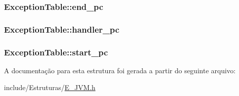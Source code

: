 \subsubsection[{end\+\_\+pc}]{ Exception\+Table\+::end\+\_\+pc}\label{struct_exception_table_ac2df73606ebe48af50a629f83fe9c677}
\hypertarget{struct_exception_table_a664ec4b395e02d3a5bfa6cef3493c1e7}{}
\subsubsection[{handler\+\_\+pc}]{ Exception\+Table\+::handler\+\_\+pc}\label{struct_exception_table_a664ec4b395e02d3a5bfa6cef3493c1e7}
\hypertarget{struct_exception_table_af137b3a966825f91146039797d3b1ba5}{}
\subsubsection[{start\+\_\+pc}]{ Exception\+Table\+::start\+\_\+pc}\label{struct_exception_table_af137b3a966825f91146039797d3b1ba5}


A documentação para esta estrutura foi gerada a partir do seguinte arquivo\+:\begin{DoxyCompactItemize}
\item 
include/\+Estruturas/\hyperlink{_e___j_v_m_8h}{E\+\_\+\+J\+V\+M.\+h}\end{DoxyCompactItemize}
